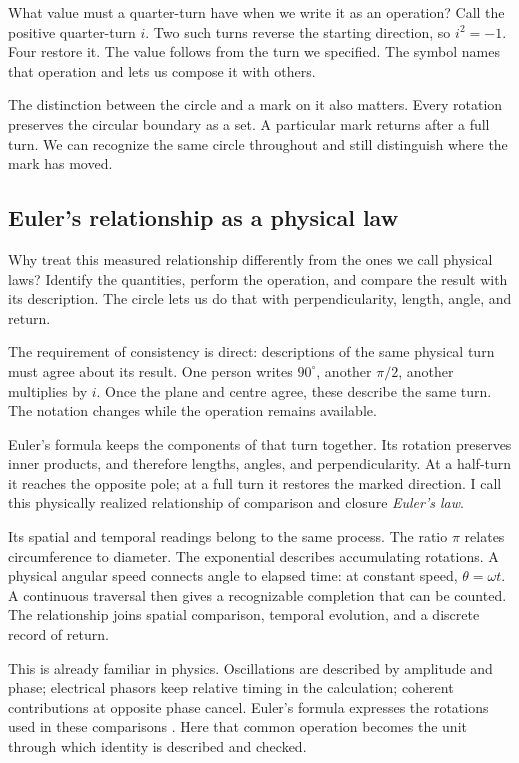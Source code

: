 \documentclass[11pt,a4paper]{article}
\theoremstyle{definition}
\begin{document}
What value must a quarter-turn have when we write it as an operation?
Call the positive quarter-turn $i$. Two such turns reverse the
starting direction, so $i^2=-1$. Four restore it. The value follows
from the turn we specified. The symbol names that operation and lets
us compose it with others.

The distinction between the circle and a mark on it also matters.
Every rotation preserves the circular boundary as a set. A particular
mark returns after a full turn. We can recognize the same circle
throughout and still distinguish where the mark has moved.

\subsection{Euler's relationship as a physical law}

Why treat this measured relationship differently from the ones we
call physical laws? Identify the quantities, perform the operation,
and compare the result with its description. The circle lets us do
that with perpendicularity, length, angle, and return.

The requirement of consistency is direct: descriptions of the same
physical turn must agree about its result. One person writes
$90^\circ$, another $\pi/2$, another multiplies by $i$. Once the
plane and centre agree, these describe the same turn.
The notation changes while the operation remains available.

Euler's formula keeps the components of that turn together. Its
rotation preserves inner products, and therefore lengths, angles,
and perpendicularity. At a half-turn it reaches the opposite pole;
at a full turn it restores the marked direction. I call this
physically realized relationship of comparison and closure
\emph{Euler's law}.

Its spatial and temporal readings belong to the same process.
The ratio $\pi$ relates circumference to diameter. The exponential
describes accumulating rotations. A physical angular speed connects
angle to elapsed time: at constant speed, $\theta=\omega t$.
A continuous traversal then gives a recognizable completion that
can be counted. The relationship joins spatial comparison, temporal
evolution, and a discrete record of return.

This is already familiar in physics. Oscillations are described by
amplitude and phase; electrical phasors keep relative timing in the
calculation; coherent contributions at opposite phase cancel.
Euler's formula expresses the rotations used in these comparisons
\citep[Vol.~I, Chapter~23; Vol.~II, Chapter~22;
Vol.~III, Chapter~3]{Feynman}. Here that common operation becomes
the unit through which identity is described and checked.
\end{document}
